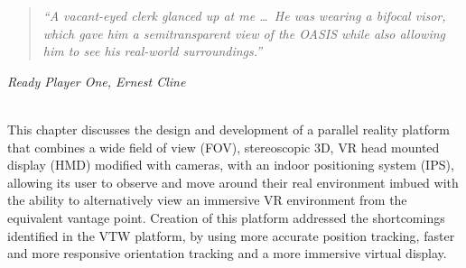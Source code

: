 \begin{quote}
	\textit{``A vacant-eyed clerk glanced up at me \ldots\ He was wearing a bifocal visor, which gave him a semitransparent view of the OASIS while also allowing him to see his real-world surroundings.''}%
\end{quote}
\hfill \textit{Ready Player One, Ernest Cline}
\\
\\


\label{chapter-mirrorshades}

This chapter discusses the design and development of a parallel reality platform that combines a wide field of view (FOV), stereoscopic 3D, VR head mounted display (HMD) modified with cameras, with an indoor positioning system (IPS), allowing its user to observe and move around their real environment imbued with the ability to alternatively view an immersive VR environment from the equivalent vantage point. Creation of this platform addressed the shortcomings identified in the VTW platform, by using more accurate position tracking, faster and more responsive orientation tracking and a more immersive virtual display.




